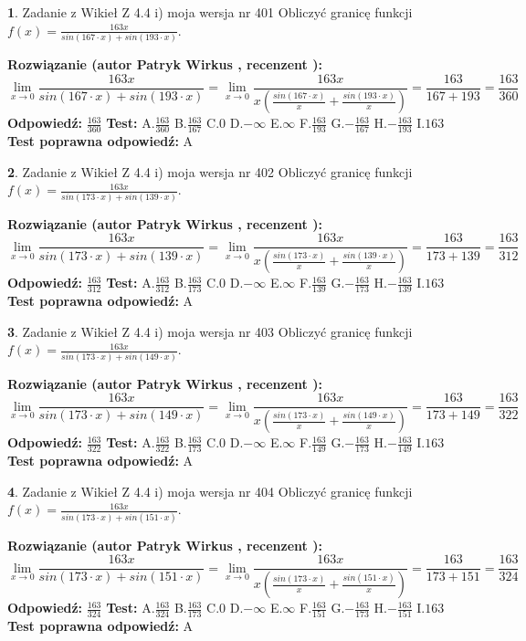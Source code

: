 \documentclass[12pt, a4paper]{article}
\theoremstyle{definition} %
\newtheorem{zad}{}
\newcommand{\zadStart}[1]{\begin{zad}#1\newline}
\newcommand{\zadStop}{\end{zad}}
\newcommand{\rozwStart}[2]{\noindent \textbf{Rozwiązanie (autor #1 , recenzent #2): }\newline}
\newcommand{\rozwStop}{\newline}
\newcommand{\odpStart}{\noindent \textbf{Odpowiedź:}\newline}
\newcommand{\odpStop}{\newline}
\newcommand{\testStart}{\noindent \textbf{Test:}\newline}
\newcommand{\testStop}{\newline}
\newcommand{\kluczStart}{\noindent \textbf{Test poprawna odpowiedź:}\newline}
\newcommand{\kluczStop}{\newline}
\begin{document}
\zadStart{Zadanie z Wikieł Z 4.4 i) moja wersja nr 401}
Obliczyć granicę funkcji $f(x)=\frac{163x}{sin(167\cdot x) +sin(193\cdot x)}$.
\zadStop
\rozwStart{Patryk Wirkus}{}
$$\lim\limits_{x\to 0}\frac{163x}{sin(167\cdot x) +sin(193\cdot x)}=\lim\limits_{x\to 0}\frac{163x}{x(\frac{sin(167\cdot x)}{x}+\frac{sin(193\cdot x)}{x})}=\frac{163}{167+193} = \frac{163}{360}$$
\rozwStop
\odpStart
$\frac{163}{360}$
\odpStop
\testStart
A.$\frac{163}{360}$
B.$\frac{163}{167}$
C.$0$
D.$-\infty$
E.$\infty$
F.$\frac{163}{193}$
G.$-\frac{163}{167}$
H.$-\frac{163}{193}$
I.$163$
\testStop
\kluczStart
A
\kluczStop



\zadStart{Zadanie z Wikieł Z 4.4 i) moja wersja nr 402}
Obliczyć granicę funkcji $f(x)=\frac{163x}{sin(173\cdot x) +sin(139\cdot x)}$.
\zadStop
\rozwStart{Patryk Wirkus}{}
$$\lim\limits_{x\to 0}\frac{163x}{sin(173\cdot x) +sin(139\cdot x)}=\lim\limits_{x\to 0}\frac{163x}{x(\frac{sin(173\cdot x)}{x}+\frac{sin(139\cdot x)}{x})}=\frac{163}{173+139} = \frac{163}{312}$$
\rozwStop
\odpStart
$\frac{163}{312}$
\odpStop
\testStart
A.$\frac{163}{312}$
B.$\frac{163}{173}$
C.$0$
D.$-\infty$
E.$\infty$
F.$\frac{163}{139}$
G.$-\frac{163}{173}$
H.$-\frac{163}{139}$
I.$163$
\testStop
\kluczStart
A
\kluczStop



\zadStart{Zadanie z Wikieł Z 4.4 i) moja wersja nr 403}
Obliczyć granicę funkcji $f(x)=\frac{163x}{sin(173\cdot x) +sin(149\cdot x)}$.
\zadStop
\rozwStart{Patryk Wirkus}{}
$$\lim\limits_{x\to 0}\frac{163x}{sin(173\cdot x) +sin(149\cdot x)}=\lim\limits_{x\to 0}\frac{163x}{x(\frac{sin(173\cdot x)}{x}+\frac{sin(149\cdot x)}{x})}=\frac{163}{173+149} = \frac{163}{322}$$
\rozwStop
\odpStart
$\frac{163}{322}$
\odpStop
\testStart
A.$\frac{163}{322}$
B.$\frac{163}{173}$
C.$0$
D.$-\infty$
E.$\infty$
F.$\frac{163}{149}$
G.$-\frac{163}{173}$
H.$-\frac{163}{149}$
I.$163$
\testStop
\kluczStart
A
\kluczStop



\zadStart{Zadanie z Wikieł Z 4.4 i) moja wersja nr 404}
Obliczyć granicę funkcji $f(x)=\frac{163x}{sin(173\cdot x) +sin(151\cdot x)}$.
\zadStop
\rozwStart{Patryk Wirkus}{}
$$\lim\limits_{x\to 0}\frac{163x}{sin(173\cdot x) +sin(151\cdot x)}=\lim\limits_{x\to 0}\frac{163x}{x(\frac{sin(173\cdot x)}{x}+\frac{sin(151\cdot x)}{x})}=\frac{163}{173+151} = \frac{163}{324}$$
\rozwStop
\odpStart
$\frac{163}{324}$
\odpStop
\testStart
A.$\frac{163}{324}$
B.$\frac{163}{173}$
C.$0$
D.$-\infty$
E.$\infty$
F.$\frac{163}{151}$
G.$-\frac{163}{173}$
H.$-\frac{163}{151}$
I.$163$
\testStop
\kluczStart
A
\kluczStop
\end{document}

